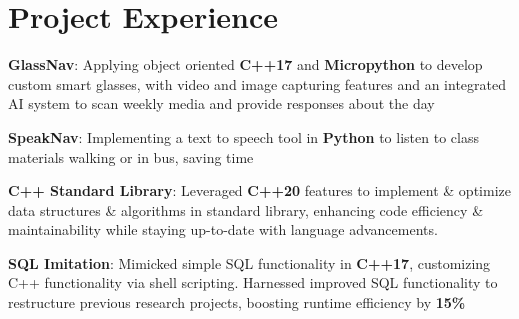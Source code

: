 \documentclass[letterpaper,11pt]{article}
\begin{document}
\section{Project Experience}
 \begin{itemize}[leftmargin=0.15in, label={}]
    \small{\item{

    \textbf{GlassNav}{: Applying object oriented \textbf{C++17} and 
\textbf{Micropython} to develop custom smart glasses, with video and image 
capturing features and an integrated AI system to scan weekly media and 
provide responses about the day}

    \textbf{SpeakNav}{: Implementing a text to speech tool in 
\textbf{Python} to listen to class materials walking or in bus, saving 
time}

    \textbf{C++ Standard Library}{: Leveraged \textbf{C++20} features to  
implement \& optimize data structures \& algorithms in standard library, 
enhancing code efficiency \& maintainability while staying up-to-date with 
language advancements.} $ $

     \textbf{SQL Imitation}{: Mimicked simple SQL functionality in 
\textbf{C++17}, customizing C++ functionality via shell scripting. 
Harnessed improved SQL functionality to restructure previous research 
projects, boosting runtime efficiency by \textbf{15\%}} $ $

    }}
 \end{itemize}


    
\end{document}
